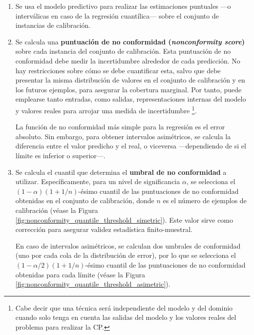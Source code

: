 \begin{enumerate}
    \item Se usa el modelo predictivo para realizar las estimaciones puntuales ---o interválicas en caso de la
    regresión cuantílica--- sobre el conjunto de instancias de calibración. 

    
    \item Se calcula una \textbf{puntuación de no conformidad (\textit{nonconformity score})} sobre cada 
    instancia del conjunto de calibración. 
    Esta puntuación de no conformidad debe medir la incertidumbre alrededor de cada predicción. No hay
    restricciones sobre cómo se debe cuantificar esta, salvo que debe presentar la misma distribución de 
    valores en el conjunto de calibración y en los futuros ejemplos, para asegurar la cobertura marginal. 
    Por tanto, puede emplearse tanto entradas, como salidas, representaciones internas del modelo y valores
    reales para arrojar una medida de incertidumbre
    \footnote{
        Cabe decir que una técnica será independiente del modelo y del dominio cuando solo tenga en cuenta
        las salidas del modelo y los valores reales del problema para realizar la CP.
    }.  

    La función de no conformidad más simple para la regresión es el error absoluto.
    Sin embargo, para obtener intervalos asimétricos, se calcula la diferencia entre el valor predicho y el
    real, o viceversa ---dependiendo de si el límite es inferior o superior---. 


    \item Se calcula el cuantil que determina el \textbf{umbral de no conformidad} a utilizar.
    Específicamente, para un nivel de significancia $\alpha$, se selecciona el $(1 - \alpha)(1 + 1/n)$-ésimo 
    cuantil de las puntuaciones de no conformidad obtenidas en el conjunto de calibración, donde $n$ es el 
    número de ejemplos de calibración
    (véase la Figura \ref{fig:nonconformity_quantile_threshold_simetric}). 
    Este valor sirve como corrección para asegurar validez estadística finito-muestral.

    En caso de intervalos asimétricos, se calculan dos umbrales de conformidad (uno por cada cola de la 
    distribución de error), por lo que se selecciona el $(1 - \alpha/2)(1 + 1/n)$-ésimo cuantil de las 
    puntuaciones de no conformidad obtenidas para cada límite 
    (véase la Figura \ref{fig:nonconformity_quantile_threshold_asimetric}).

    \begin{figure}[h]
        \centering


\end{figure}
\end{enumerate}
